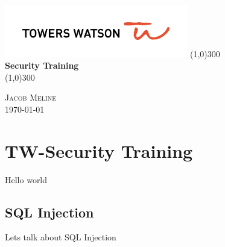 \documentclass[a4paper, titlepage]{article}
\begin{document}
\begin{titlepage}
    \begin{center}
        \includegraphics[width=8cm]{Towers-watson}
        \line(1,0){300} \\
        [0.25in]
        \huge{\bfseries Security Training} \\
        [2mm]
        \line(1,0){300} \\
        [10cm]
    \end{center}
    \begin{flushright}
        \textsc{\large Jacob Meline } \\
        \today
    \end{flushright}
\end{titlepage}

\newpage

\section{TW-Security Training}
Hello world
\subsection{SQL Injection}
Lets talk about SQL Injection
\end{document}
